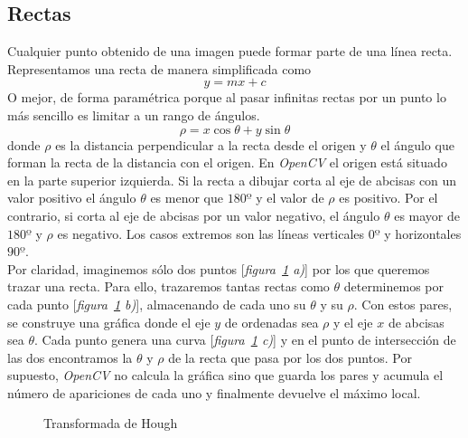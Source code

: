 \subsection{Rectas}
Cualquier punto obtenido de una imagen puede formar parte de una línea
recta. Representamos una recta de manera simplificada como
\begin{equation*}
  y = mx + c
\end{equation*}
O mejor, de forma paramétrica porque al pasar infinitas rectas por un
punto lo más sencillo es limitar a un rango de ángulos.
\begin{equation*}
  \rho = x \cos \theta + y \sin \theta
\end{equation*}
donde $\rho$ es la distancia perpendicular a la recta desde el origen y
$\theta$ el ángulo que forman la recta de la distancia con el
origen. En \emph{OpenCV} el origen está situado en la parte superior
izquierda. Si la recta a dibujar corta al eje de abcisas con un valor
positivo el ángulo $\theta$ es menor que $180º$ y el valor de $\rho$
es positivo. Por el contrario, si corta al eje de abcisas por un valor
negativo, el ángulo $\theta$ es mayor de $180º$ y $\rho$ es
negativo. Los casos extremos son las líneas verticales $0º$ y
horizontales $90º$.\\
Por claridad, imaginemos sólo dos puntos [\emph{figura~\ref{fig:hough}
  a)}] por los que queremos trazar una recta. Para ello, trazaremos
tantas rectas como $\theta$ determinemos por cada punto
[\emph{figura~\ref{fig:hough} b)}], almacenando de cada uno su
$\theta$ y su $\rho$. Con estos pares, se construye una gráfica donde
el eje $y$ de ordenadas sea $\rho$ y el eje $x$ de abcisas sea
$\theta$. Cada punto genera una curva [\emph{figura~\ref{fig:hough}
  c)}] y en el punto de intersección de las dos encontramos la
$\theta$ y $\rho$ de la recta que pasa por los dos puntos. Por
supuesto, \emph{OpenCV} no calcula la gráfica sino que guarda los
pares y acumula el número de apariciones de cada uno y finalmente
devuelve el máximo local.

\begin{figure}[H]
  \caption{Transformada de Hough}
  \centering \setlength\fboxsep{0pt} \setlength\fboxrule{0.5pt}
  \label{fig:hough}
\end{figure}

